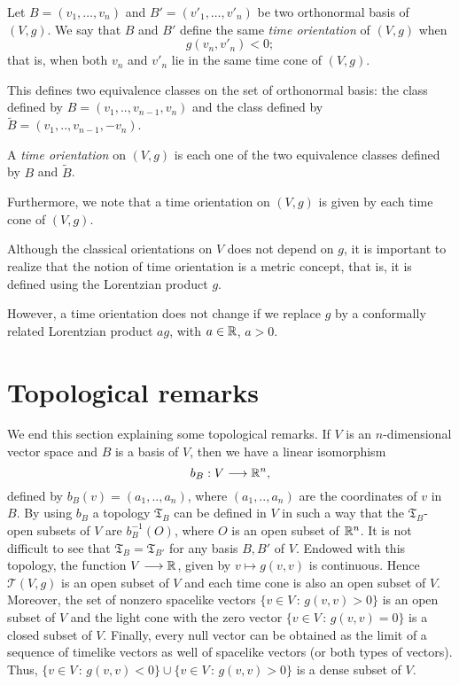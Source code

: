 Let $B = (v_1, \dots, v_n)$ and $B' = (v'_1, \dots, v'_n)$ be two orthonormal basis of $(V,g)$. We say that $B$ and $B'$ define the same \emph{time orientation} of $(V,g)$ when
\[
	g(v_n, v'_n) < 0;
\]
that is, when both $v_n$ and $v'_n$ lie in the same time cone of $(V,g)$.

This defines two equivalence classes on the set of orthonormal basis: the class defined by $B=(v_1,..,v_{n-1},v_n)$ and the class defined by $\tilde{B}=(v_1,..,v_{n-1},-v_n)$.

\begin{definition}
	\label{def:vstimeorientation}
	A \emph{time orientation} on $(V,g)$ is each one of the two equivalence classes defined by $B$ and $\tilde{B}$.
\end{definition}

Furthermore, we note that a time orientation on $(V,g)$ is given by each time cone of $(V,g)$.

Although the classical orientations on $V$ does not depend on $g$, it is important to realize that the notion of time orientation is a metric concept, that is, it is defined using the Lorentzian product $g$.

However, a time orientation does not change if we replace $g$ by a conformally related Lorentzian product $ag$, with $a\in \mathbb{R}$, $a>0$.

\section{Topological remarks}
\label{sec:toporemarks}

We end this section explaining some topological remarks. If $V$ is an $n$-dimensional vector space and $B$ is a basis of $V$, then we have a linear isomorphism $$b_B : V \longrightarrow \mathbb{R}^n,$$ defined by $b_B(v)=(a_1,..,a_n)$, where $(a_1,..,a_n)$ are the coordinates of $v$ in $B$. By using $b_B$ a topology $\mathfrak{T}_B$ can be defined in $V$ in such a way that the $\mathfrak{T}_B$-open subsets of $V$ are $b_B^{-1}(O)$, where $O$ is an open subset of $\mathbb{R}^n$. It is not difficult to see that $\mathfrak{T}_B = \mathfrak{T}_{B'}$ for any basis $B,B'$ of $V$. Endowed with this topology, the function $V \longrightarrow \mathbb{R}$, given by $v \mapsto g(v,v)$ is continuous. Hence $\mathcal{T}(V,g)$ is an open subset of $V$ and each time cone is also an open subset of $V$. Moreover, the set of nonzero spacelike vectors $\{v\in V \, : \, g(v,v)>0 \}$ is an open subset of $V$ and the light cone with the zero vector $\{v\in V \, : \, g(v,v)=0 \}$ is a closed subset of $V$. Finally, every null vector can be obtained as the limit of a sequence of timelike vectors as well of spacelike vectors (or both types of vectors). Thus, $\{v\in V \, : \, g(v,v)<0 \} \cup \{v\in V \, : \, g(v,v)>0 \}$
is a dense subset of $V$.

